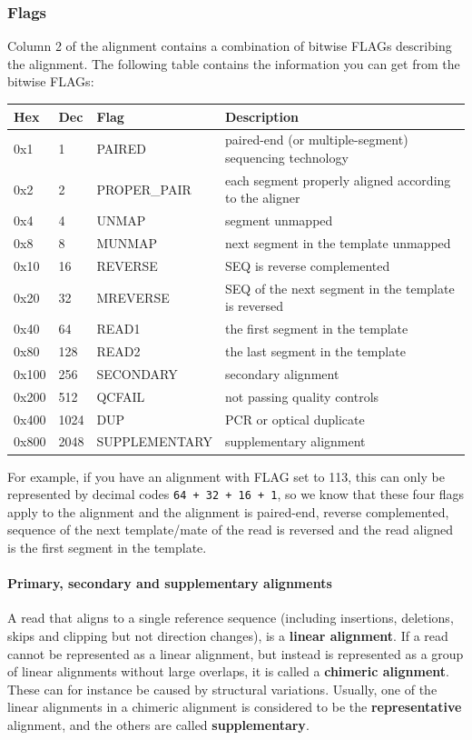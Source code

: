 \documentclass[11pt]{article}
\begin{document}
    \hypertarget{flags}{%
\subsubsection{Flags}\label{flags}}

Column 2 of the alignment contains a combination of bitwise FLAGs
describing the alignment. The following table contains the information
you can get from the bitwise FLAGs:

\begin{longtable}[]{@{}llll@{}}
\hline
Hex & Dec & Flag & Description\tabularnewline
\hline
\endhead
0x1 & 1 & PAIRED & paired-end (or multiple-segment) sequencing
technology\tabularnewline
0x2 & 2 & PROPER\_PAIR & each segment properly aligned according to the
aligner\tabularnewline
0x4 & 4 & UNMAP & segment unmapped\tabularnewline
0x8 & 8 & MUNMAP & next segment in the template unmapped\tabularnewline
0x10 & 16 & REVERSE & SEQ is reverse complemented\tabularnewline
0x20 & 32 & MREVERSE & SEQ of the next segment in the template is
reversed\tabularnewline
0x40 & 64 & READ1 & the first segment in the template\tabularnewline
0x80 & 128 & READ2 & the last segment in the template\tabularnewline
0x100 & 256 & SECONDARY & secondary alignment\tabularnewline
0x200 & 512 & QCFAIL & not passing quality controls\tabularnewline
0x400 & 1024 & DUP & PCR or optical duplicate\tabularnewline
0x800 & 2048 & SUPPLEMENTARY & supplementary alignment\tabularnewline
\hline
\end{longtable}

For example, if you have an alignment with FLAG set to 113, this can
only be represented by decimal codes \texttt{64\ +\ 32\ +\ 16\ +\ 1}, so
we know that these four flags apply to the alignment and the alignment
is paired-end, reverse complemented, sequence of the next template/mate
of the read is reversed and the read aligned is the first segment in the
template.

\hypertarget{primary-secondary-and-supplementary-alignments}{%
\paragraph{Primary, secondary and supplementary
alignments}\label{primary-secondary-and-supplementary-alignments}}

A read that aligns to a single reference sequence (including insertions,
deletions, skips and clipping but not direction changes), is a
\textbf{linear alignment}. If a read cannot be represented as a linear
alignment, but instead is represented as a group of linear alignments
without large overlaps, it is called a \textbf{chimeric alignment}.
These can for instance be caused by structural variations. Usually, one
of the linear alignments in a chimeric alignment is considered to be the
\textbf{representative} alignment, and the others are called
\textbf{supplementary}.
\end{document}

